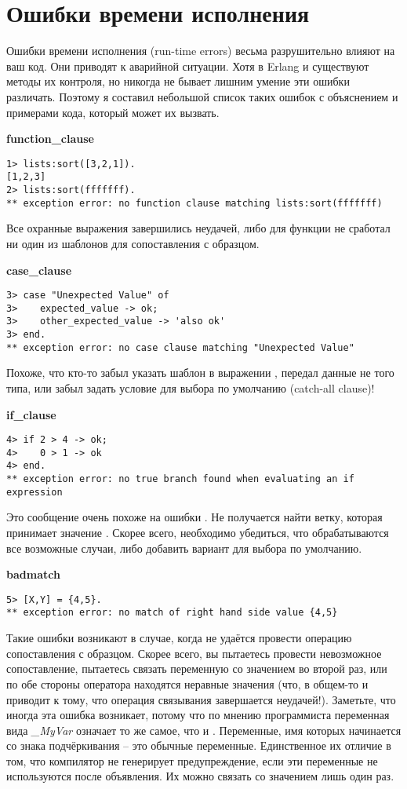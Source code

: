 \section{Ошибки времени исполнения}
\label{run-time-errors}
Ошибки времени исполнения (run\--time errors) весьма разрушительно влияют на ваш код. Они приводят к аварийной ситуации.
Хотя в Erlang и существуют методы их контроля, но никогда не бывает лишним умение эти ошибки различать.
Поэтому я составил небольшой список таких ошибок с объяснением и примерами кода, который может их вызвать.

\textbf{function\_clause}
\begin{lstlisting}[style=erlang]
1> lists:sort([3,2,1]).
[1,2,3]
2> lists:sort(fffffff).
** exception error: no function clause matching lists:sort(fffffff)
\end{lstlisting}

Все охранные выражения завершились неудачей, либо для функции не сработал ни один из шаблонов для сопоставления с образцом.
\blankline

\textbf{case\_clause}
\begin{lstlisting}[style=erlang]
3> case "Unexpected Value" of
3>    expected_value -> ok;
3>    other_expected_value -> 'also ok'
3> end.
** exception error: no case clause matching "Unexpected Value"
\end{lstlisting}

Похоже, что кто\--то забыл указать шаблон в выражении , передал данные не того типа, или забыл задать условие для выбора по умолчанию (catch\--all clause)!
\blankline

\textbf{if\_clause}
\begin{lstlisting}[style=erlang]
4> if 2 > 4 -> ok;
4>    0 > 1 -> ok
4> end.
** exception error: no true branch found when evaluating an if expression
\end{lstlisting}

Это сообщение очень похоже на ошибки . Не получается найти ветку, которая принимает значение .
Скорее всего, необходимо убедиться, что обрабатываются все возможные случаи, либо добавить вариант  для выбора по умолчанию.
\blankline

\textbf{badmatch}
\begin{lstlisting}[style=erlang]
5> [X,Y] = {4,5}.
** exception error: no match of right hand side value {4,5}
\end{lstlisting}

Такие ошибки возникают в случае, когда не удаётся провести операцию сопоставления с образцом.
Скорее всего, вы пытаетесь провести невозможное сопоставление, пытаетесь связать переменную со значением во второй раз, или по обе стороны оператора \ops{\strut=} находятся неравные значения (что, в общем\--то и приводит к тому, что операция связывания завершается неудачей!).
Заметьте, что иногда эта ошибка возникает, потому что по мнению программиста переменная вида \emph{\_MyVar} означает то же самое, что и \ops{\strut\_}.
Переменные, имя которых начинается со знака подчёркивания \--- это обычные переменные.
Единственное их отличие в том, что компилятор не генерирует предупреждение, если эти переменные не используются после объявления.
Их можно связать со значением лишь один раз.
\blankline

